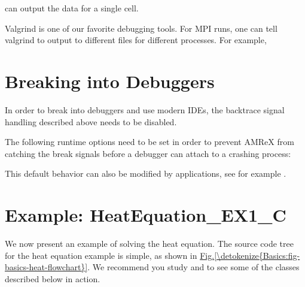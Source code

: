 \documentclass[letterpaper,10pt,english]{sphinxmanual}
\begin{document}
\begin{sphinxVerbatim}[commandchars=\\\{\}]
         
\end{sphinxVerbatim}

\sphinxAtStartPar
can output the data for a single cell.

\sphinxAtStartPar
Valgrind is one of our favorite debugging tools.  For MPI runs, one can
tell valgrind to output to different files for different processes.
For example,

\begin{sphinxVerbatim}[commandchars=\\\{\}]
\end{sphinxVerbatim}


\section{Breaking into Debuggers}
\label{\detokenize{Basics:breaking-into-debuggers}}
\sphinxAtStartPar
In order to break into debuggers and use modern IDEs, the backtrace signal handling described above needs to be disabled.

\sphinxAtStartPar
The following runtime options need to be set in order to prevent AMReX from catching the break signals before a debugger can attach to a crashing process:

\begin{sphinxVerbatim}[commandchars=\\\{\}]
\end{sphinxVerbatim}

\sphinxAtStartPar
This default behavior can also be modified by applications, see for example .


\section{Example: HeatEquation\_EX1\_C}
\label{\detokenize{Basics:example-heatequation-ex1-c}}\label{\detokenize{Basics:sec-basics-heat1}}
\sphinxAtStartPar
We now present an example of solving the heat equation.  The source
code tree for the heat equation example is simple, as shown in
\hyperref[\detokenize{Basics:fig-basics-heat-flowchart}]{Fig.\@ \ref{\detokenize{Basics:fig-basics-heat-flowchart}}}. We recommend you study
 and  to see some of the classes described
below in action.
\end{document}
